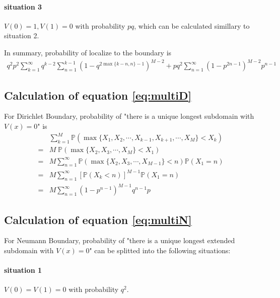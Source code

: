 \documentclass[12pt,a4paper]{article}
\begin{document}
\begin{appendices}
\paragraph*{situation 3}
$V(0) = 1, V(1) = 0$ with probability $p q$, which can be calculated simillary to situation 2.

In summary, probability of localize to the boundary is
\begin{align*}
q^2 p^2 \sum_{k=1}^{\infty} q^{k-2} \sum_{n=1}^{k-1} (1 - q^{2 \max\{k-n,n\}-1})^{M-2} + p q^2 \sum_{n=1}^{\infty} (1 - p^{2 n-1})^{M-2} p^{n-1}
\end{align*}

\subsection{Calculation of equation \ref{eq:multiD}}

For Dirichlet Boundary, probability of "there is a unique longest subdomain with $V(x)=0$" is
\begin{align*}
  & \sum_{k=1}^{M} \mathbb{P}(\max\{X_1, X_2, \cdots, X_{k-1}, X_{k+1}, \cdots, X_{M}\} < X_k) \\
= & M \; \mathbb{P}(\max\{X_{2}, X_{3}, \cdots, X_{M}\} < X_1) \\
= & M \sum_{n=1}^{\infty} \mathbb{P}(\max\{X_2, X_3, \cdots, X_{M-1}\} < n) \mathbb{P}(X_1 = n) \\
= & M \sum_{n=1}^{\infty} [\mathbb{P}(X_k < n)]^{M-1} \mathbb{P}(X_1 = n)\\
= & M \sum_{n=1}^{\infty} (1 - p^{n-1})^{M-1} q^{n-1} p
\end{align*}

\subsection{Calculation of equation \ref{eq:multiN}}

For Neumann Boundary, probability of "there is a unique longest extended subdomain with $V(x)=0$" can be splitted into the following situations:

\paragraph*{situation 1}
$V(0) = V(1) = 0$ with probability $q^2$.


\end{appendices}
\end{document}
